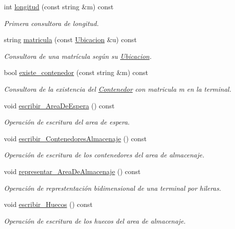 \begin{DoxyCompactItemize}
int \hyperlink{class_terminal_afc6d0f22bcc642c6ac4355e0b02a7d79}{longitud} (const string \&m) const
\begin{DoxyCompactList}\small\item\em Primera consultora de longitud. \end{DoxyCompactList}\item 
string \hyperlink{class_terminal_a674811a7b56f57ff5b447d10565e923b}{matricula} (const \hyperlink{class_ubicacion}{Ubicacion} \&u) const
\begin{DoxyCompactList}\small\item\em Consultora de una matrícula según su \hyperlink{class_ubicacion}{Ubicacion}. \end{DoxyCompactList}\item 
bool \hyperlink{class_terminal_a6b2cb1486f78ef82f759fb071bb1049d}{existe\+\_\+contenedor} (const string \&m) const
\begin{DoxyCompactList}\small\item\em Consultora de la existencia del \hyperlink{class_contenedor}{Contenedor} con matricula {\itshape m} en la terminal. \end{DoxyCompactList}\item 
void \hyperlink{class_terminal_a3da2635443b21d89e5fecc47153a888f}{escribir\+\_\+\+Area\+De\+Espera} () const
\begin{DoxyCompactList}\small\item\em Operación de escritura del area de espera. \end{DoxyCompactList}\item 
void \hyperlink{class_terminal_a24c74e2dd8c8e41452a7e890bc925f0e}{escribir\+\_\+\+Contenedores\+Almacenaje} () const
\begin{DoxyCompactList}\small\item\em Operación de escritura de los contenedores del area de almacenaje. \end{DoxyCompactList}\item 
void \hyperlink{class_terminal_a32d375e8cecdafbbf0a291f646456dd6}{representar\+\_\+\+Area\+De\+Almacenaje} () const
\begin{DoxyCompactList}\small\item\em Operación de represtentación bidimensional de una terminal por hileras. \end{DoxyCompactList}\item 
void \hyperlink{class_terminal_afbfd7c045961e20718f9b5ffa1a31aa1}{escribir\+\_\+\+Huecos} () const
\begin{DoxyCompactList}\small\item\em Operación de escritura de los huecos del area de almacenaje. \end{DoxyCompactList}\end{DoxyCompactItemize}


